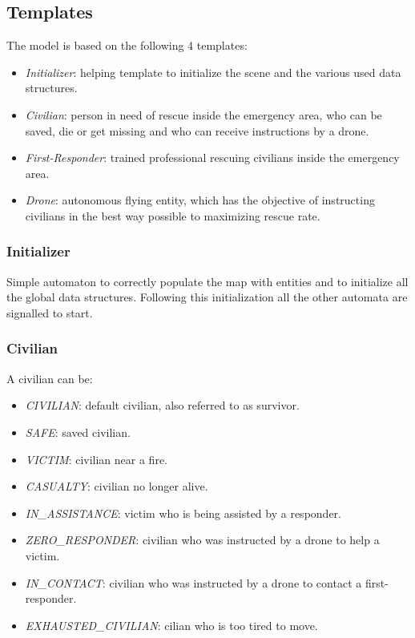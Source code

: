 \subsection{Templates}
The model is based on the following 4 templates:
\begin{itemize}
	\item \textit{Initializer}: helping template to initialize the scene and the various used data structures.
	\item \textit{Civilian}: person in need of rescue inside the emergency area, who can be saved, die or get missing and who can receive instructions by a drone.
	\item \textit{First-Responder}: trained professional rescuing civilians inside the emergency area.
	\item \textit{Drone}: autonomous flying entity, which has the objective of instructing civilians in the best way possible to maximizing rescue rate.
\end{itemize}


\subsubsection{Initializer}
Simple automaton to correctly populate the map with entities and to initialize all the global data structures. Following this initialization all the other automata are signalled to start.


\subsubsection{Civilian}
A civilian can be:
\begin{itemize}
	\item \textit{CIVILIAN}: default civilian, also referred to as survivor.
	\item \textit{SAFE}: saved civilian.
	\item \textit{VICTIM}: civilian near a fire.
	\item \textit{CASUALTY}: civilian no longer alive.
	\item \textit{IN\_ASSISTANCE}: victim who is being assisted by a responder.
	\item \textit{ZERO\_RESPONDER}: civilian who was instructed by a drone to help a victim.
	\item \textit{IN\_CONTACT}: civilian who was instructed by a drone to contact a first-responder.
	\item \textit{EXHAUSTED\_CIVILIAN}: cilian who is too tired to move.
\end{itemize}

